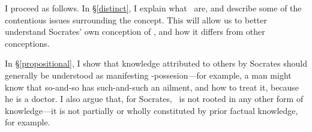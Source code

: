 \documentclass[11pt,letterpaper,oneside]{amsart} %
\begin{document}






I proceed as follows. In \S\ref{distinct}, I explain what \technai\ are, and describe some of the contentious issues surrounding the concept. This will allow us to better understand Socrates' own conception of \techne, and how it differs from other conceptions.

In \S\ref{propositional}, I show that knowledge attributed to others by Socrates should generally be understood as manifesting \techne-possesion---for example, a man might know that so-and-so has such-and-such an ailment, and how to treat it, because he is a doctor. I also argue that, for Socrates, \techne\ is not rooted in any other form of knowledge---it is not partially or wholly constituted by prior factual knowledge, for example.
\end{document}
